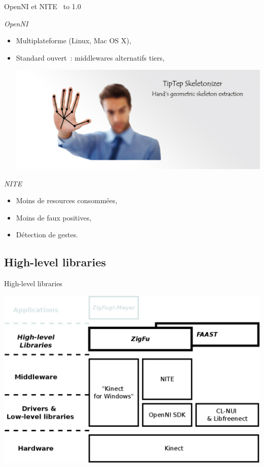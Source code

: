 \begin{frame}{OpenNI et NITE~\cite{microsoft_vs_openni}}
\vbox to 1.0\textheight
{
  \emph{OpenNI}
  \begin{itemize}
    \item<1-> Multiplateforme (Linux, Mac OS X),
    \item<2-> Standard ouvert~: middlewares alternatifs tiers,
    {
      \vfill
      \begin{center}
      \includegraphics[width=0.8\linewidth]{../images/tiptep}
      \end{center}
    }
  \end{itemize}
  
  {
  \emph{NITE}
  \begin{itemize}
    \item<3-> Moins de resources consommées,
    \item<4-> Moins de faux positives,
    \item<5-> Détection de gestes.
  \end{itemize}
  }
\vfill
}
\end{frame}

\subsection{High-level libraries}
\begin{frame}{High-level libraries}
\begin{center}
\includegraphics[width=0.9\linewidth]{../images/technology_overview_3}
\end{center}
\end{frame}

